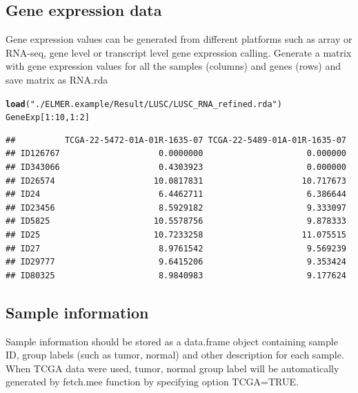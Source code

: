 \documentclass{article}\usepackage[]{graphicx}\usepackage[]{color}
\makeatletter
\newcommand{\hlnum}[1]{\textcolor[rgb]{0.686,0.059,0.569}{#1}}%
\newcommand{\hlstr}[1]{\textcolor[rgb]{0.192,0.494,0.8}{#1}}%
\newcommand{\hlopt}[1]{\textcolor[rgb]{0,0,0}{#1}}%
\newcommand{\hlstd}[1]{\textcolor[rgb]{0.345,0.345,0.345}{#1}}%
\newcommand{\hlkwd}[1]{\textcolor[rgb]{0.737,0.353,0.396}{\textbf{#1}}}%
\newenvironment{kframe}{%
 \def\at@end@of@kframe{}%
 \ifinner\ifhmode%
  \def\at@end@of@kframe{\end{minipage}}%
  \begin{minipage}{\columnwidth}%
 \fi\fi%
 \def\FrameCommand##1{\hskip\@totalleftmargin \hskip-\fboxsep
 \colorbox{shadecolor}{##1}\hskip-\fboxsep
     \hskip-\linewidth \hskip-\@totalleftmargin \hskip\columnwidth}%
 \MakeFramed {\advance\hsize-\width
   \@totalleftmargin\z@ \linewidth\hsize
   \@setminipage}}%
 {\par\unskip\endMakeFramed%
 \at@end@of@kframe}
\newenvironment{knitrout}{}{} %
\makeatother
\begin{document}
\subsection{Gene expression data}
Gene expression values can be generated from different platforms such as array or 
RNA-seq, gene level or transcript level gene expression calling. Generate a matrix 
with gene expression values for all the samples (columns) and genes (rows) 
and save matrix as RNA.rda

\begin{knitrout}
\color{fgcolor}\begin{kframe}
\begin{alltt}
\hlkwd{load}\hlstd{(}\hlstr{"./ELMER.example/Result/LUSC/LUSC_RNA_refined.rda"}\hlstd{)}
\hlstd{GeneExp[}\hlnum{1}\hlopt{:}\hlnum{10}\hlstd{,} \hlnum{1}\hlopt{:}\hlnum{2}\hlstd{]}
\end{alltt}
\begin{verbatim}
##          TCGA-22-5472-01A-01R-1635-07 TCGA-22-5489-01A-01R-1635-07
## ID126767                    0.0000000                     0.000000
## ID343066                    0.4303923                     0.000000
## ID26574                    10.0817831                    10.717673
## ID24                        6.4462711                     6.386644
## ID23456                     8.5929182                     9.333097
## ID5825                     10.5578756                     9.878333
## ID25                       10.7233258                    11.075515
## ID27                        8.9761542                     9.569239
## ID29777                     9.6415206                     9.353424
## ID80325                     8.9840983                     9.177624
\end{verbatim}
\end{kframe}
\end{knitrout}


\subsection{Sample information}
Sample information should be stored as a data.frame object containing sample ID, 
group labels (such as tumor, normal) and other description for each sample. 
When TCGA data were used, tumor, normal group label will be automatically generated by 
fetch.mee function by specifying option TCGA=TRUE.
\end{document}
